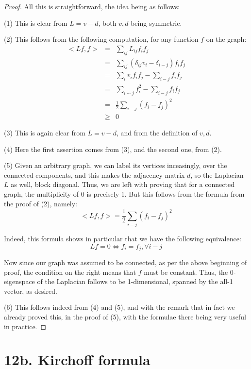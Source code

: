 \documentclass[12pt]{amsbook}
\begin{document}
\begin{proof}
All this is straightforward, the idea being as follows:

\medskip

(1) This is clear from $L=v-d$, both $v,d$ being symmetric.

\medskip

(2) This follows from the following computation, for any function $f$ on the graph:
\begin{eqnarray*}
<Lf,f>
&=&\sum_{ij}L_{ij}f_if_j\\
&=&\sum_{ij}(\delta_{ij}v_i-\delta_{i-j})f_if_j\\
&=&\sum_iv_if_if_j-\sum_{i-j}f_if_j\\
&=&\sum_{i\sim j}f_i^2-\sum_{i-j}f_if_j\\
&=&\frac{1}{2}\sum_{i-j}(f_i-f_j)^2\\
&\geq&0
\end{eqnarray*}

(3) This is again clear from $L=v-d$, and from the definition of $v,d$.

\medskip

(4) Here the first assertion comes from (3), and the second one, from (2).

\medskip

(5) Given an arbitrary graph, we can label its vertices inceasingly, over the connected components, and this makes the adjacency matrix $d$, so the Laplacian $L$ as well, block diagonal. Thus, we are left with proving that for a connected graph, the multiplicity of 0 is precisely 1. But this follows from the formula from the proof of (2), namely:
$$<Lf,f>=\frac{1}{2}\sum_{i-j}(f_i-f_j)^2$$

Indeed, this formula shows in particular that we have the following equivalence:
$$Lf=0\iff f_i=f_j,\forall i-j$$

Now since our graph was assumed to be connected, as per the above beginning of proof, the condition on the right means that $f$ must be constant. Thus, the 0-eigenspace of the Laplacian follows to be 1-dimensional, spanned by the all-1 vector, as desired.

\medskip

(6) This follows indeed from (4) and (5), and with the remark that in fact we already proved this, in the proof of (5), with the formulae there being very useful in practice.
\end{proof}

\section*{12b. Kirchoff formula}
\end{document}
